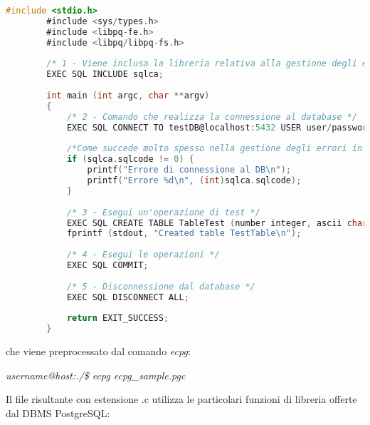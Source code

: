 \documentclass[12pt,a4paper,onecolumn,x11names]{article}
\begin{document}
	\begin{lstlisting}[language=C, caption=testECPG.pgc]
		#include <stdio.h>
		#include <sys/types.h>
		#include <libpq-fe.h>
		#include <libpq/libpq-fs.h>
		
		/* 1 - Viene inclusa la libreria relativa alla gestione degli errori tramite la variabile globale sqlca (SQL communication area) */
		EXEC SQL INCLUDE sqlca;
		
		int main (int argc, char **argv)
		{
			/* 2 - Comando che realizza la connessione al database */
			EXEC SQL CONNECT TO testDB@localhost:5432 USER user/password;
			
			/*Come succede molto spesso nella gestione degli errori in linguaggio C, il valore ritornato da una funzione viene utilizzato anche come codice di errore, considerando lo 0 come esecuzione andata a buon fine */
			if (sqlca.sqlcode != 0)	{
				printf("Errore di connessione al DB\n");
				printf("Errore %d\n", (int)sqlca.sqlcode);
			}
			
			/* 3 - Esegui un'operazione di test */
			EXEC SQL CREATE TABLE TableTest (number integer, ascii char(16));
			fprintf (stdout, "Created table TestTable\n");
			
			/* 4 - Esegui le operazioni */
			EXEC SQL COMMIT;
			
			/* 5 - Disconnessione dal database */
			EXEC SQL DISCONNECT ALL;
			
			return EXIT_SUCCESS;
		}
	\end{lstlisting}

	che viene preprocessato dal comando \textit{ecpg}:
	
	\begin{center}
		\textit{username@host:./\$ ecpg ecpg\_sample.pgc}
	\end{center}
	
	Il file risultante con estensione \textsf{.c} utilizza le particolari funzioni di libreria offerte dal DBMS PostgreSQL:
	
\end{document}
